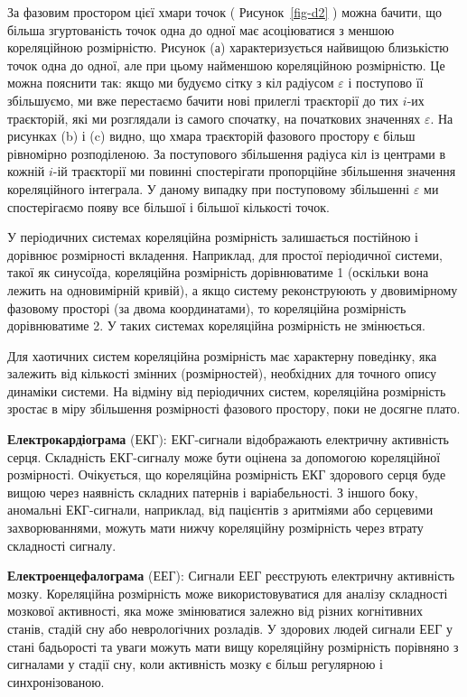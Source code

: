 \documentclass[
  letterpaper,
]{report}
\begin{document}
За фазовим простором цієї хмари точок ( Рисунок~\ref{fig-d2} ) можна
бачити, що більша згуртованість точок одна до одної має асоціюватися з
меншою кореляційною розмірністю. Рисунок (а) характеризується найвищою
близькістю точок одна до одної, але при цьому найменшою кореляційною
розмірністю. Це можна пояснити так: якщо ми будуємо сітку з кіл радіусом
\(\varepsilon\) і поступово її збільшуємо, ми вже перестаємо бачити нові
прилеглі траєкторії до тих \(i\)-их траєкторій, які ми розглядали із
самого спочатку, на початкових значеннях \(\varepsilon\). На рисунках
(b) і (c) видно, що хмара траєкторій фазового простору є більш
рівномірно розподіленою. За поступового збільшення радіуса кіл із
центрами в кожній \(i\)-ій траєкторії ми повинні спостерігати
пропорційне збільшення значення кореляційного інтеграла. У даному
випадку при поступовому збільшенні \(\varepsilon\) ми спостерігаємо
появу все більшої і більшої кількості точок.

У періодичних системах кореляційна розмірність залишається постійною і
дорівнює розмірності вкладення. Наприклад, для простої періодичної
системи, такої як синусоїда, кореляційна розмірність дорівнюватиме 1
(оскільки вона лежить на одновимірній кривій), а якщо систему
реконструюють у двовимірному фазовому просторі (за двома координатами),
то кореляційна розмірність дорівнюватиме 2. У таких системах кореляційна
розмірність не змінюється.

Для хаотичних систем кореляційна розмірність має характерну поведінку,
яка залежить від кількості змінних (розмірностей), необхідних для
точного опису динаміки системи. На відміну від періодичних систем,
кореляційна розмірність зростає в міру збільшення розмірності фазового
простору, поки не досягне плато.

\textbf{Електрокардіограма} (ЕКГ): ЕКГ-сигнали відображають електричну
активність серця. Складність ЕКГ-сигналу може бути оцінена за допомогою
кореляційної розмірності. Очікується, що кореляційна розмірність ЕКГ
здорового серця буде вищою через наявність складних патернів і
варіабельності. З іншого боку, аномальні ЕКГ-сигнали, наприклад, від
пацієнтів з аритміями або серцевими захворюваннями, можуть мати нижчу
кореляційну розмірність через втрату складності сигналу.

\textbf{Електроенцефалограма} (ЕЕГ): Сигнали ЕЕГ реєструють електричну
активність мозку. Кореляційна розмірність може використовуватися для
аналізу складності мозкової активності, яка може змінюватися залежно від
різних когнітивних станів, стадій сну або неврологічних розладів. У
здорових людей сигнали ЕЕГ у стані бадьорості та уваги можуть мати вищу
кореляційну розмірність порівняно з сигналами у стадії сну, коли
активність мозку є більш регулярною і синхронізованою.
\end{document}
